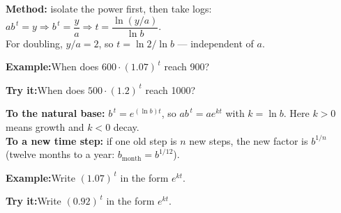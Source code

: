 \documentclass[12pt]{article}
\begin{document}
\begin{formulabox}\textbf{Method:} isolate the power first, then take logs:
$a b^{\,t} = y \Rightarrow b^{\,t} = \dfrac{y}{a} \Rightarrow
t = \dfrac{\ln (y/a)}{\ln b}$.\\[3pt]
For doubling, $y/a = 2$, so $t = \ln 2 / \ln b$ --- independent of $a$.
\end{formulabox}
\begin{examplebox}\textbf{Example:}\quad When does $600 \cdot (1.07)^{\,t}$ reach 900?
\end{examplebox}
\begin{tryitbox}\textbf{Try it:}\quad When does $500 \cdot (1.2)^{\,t}$ reach 1000?\\[2pt]
\end{tryitbox}

\begin{formulabox}\textbf{To the natural base:} $b^{\,t} = e^{(\ln b)t}$, so
$a b^{\,t} = a e^{k t}$ with $k = \ln b$. Here $k > 0$ means growth and $k < 0$ decay.\\[3pt]
\textbf{To a new time step:} if one old step is $n$ new steps, the new factor is
$b^{1/n}$ (twelve months to a year: $b_{\text{month}} = b^{1/12}$).
\end{formulabox}
\begin{examplebox}\textbf{Example:}\quad Write $(1.07)^{\,t}$ in the form $e^{k t}$.
\end{examplebox}
\begin{tryitbox}\textbf{Try it:}\quad Write $(0.92)^{\,t}$ in the form $e^{k t}$.\\[2pt]
\end{tryitbox}
\end{document}
